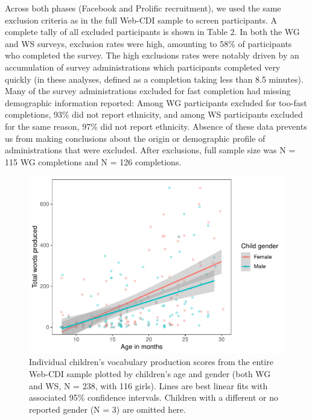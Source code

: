 \documentclass[
  english,
  ,man,floatsintext]{apa6}
\begin{document}
Across both phases (Facebook and Prolific recruitment), we used the same exclusion criteria as in the full Web-CDI sample to screen participants. A complete tally of all excluded participants is shown in Table 2. In both the WG and WS surveys, exclusion rates were high, amounting to 58\% of participants who completed the survey. The high exclusions rates were notably driven by an accumulation of survey administrations which participants completed very quickly (in these analyses, defined as a completion taking less than 8.5 minutes). Many of the survey administrations excluded for fast completion had missing demographic information reported: Among WG participants excluded for too-fast completions, 93\% did not report ethnicity, and among WS participants excluded for the same reason, 97\% did not report ethnicity. Absence of these data prevents us from making conclusions about the origin or demographic profile of administrations that were excluded. After exclusions, full sample size was N = 115 WG completions and N = 126 completions.

\begin{figure}
\centering
\includegraphics{webcdi_paper_files/figure-latex/genderses-1.pdf}
\caption{\label{fig:genderses}Individual children's vocabulary production scores from the entire Web-CDI sample plotted by children's age and gender (both WG and WS, N = 238, with 116 girls). Lines are best linear fits with associated 95\% confidence intervals. Children with a different or no reported gender (N = 3) are omitted here.}
\end{figure}
\end{document}
